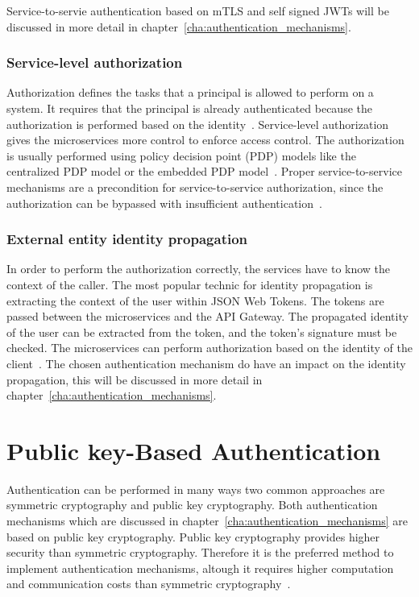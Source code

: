 Service-to-servie authentication based on mTLS and self signed JWTs will be discussed in more detail in chapter~\ref{cha:authentication_mechanisms}.

\subsubsection{Service-level authorization} 
\label{sec:service-level-authorization}
Authorization defines the tasks that a principal is allowed to perform on a system.
It requires that the principal is already authenticated because the authorization is performed based on the identity~\cite{siriwardena2014advanced}. 
Service-level authorization gives the microservices more control to enforce access control.
The authorization is usually performed using policy decision point (PDP) models like the centralized PDP model or the embedded PDP model~\cite{dias2020microservices, barabanov2020authentication}.
Proper service-to-service mechanisms are a precondition for service-to-service authorization, since the authorization can be bypassed with insufficient authentication~\cite{siriwardena2014advanced}.

\subsubsection{External entity identity propagation} 
\label{sec:external-entity-identity-propagation}
In order to perform the authorization correctly, the services have to know the context of the caller.
The most popular technic for identity propagation is extracting the context of the user within JSON Web Tokens.
The tokens are passed between the microservices and the API Gateway.
The propagated identity of the user can be extracted from the token, and the token's signature must be checked.
The microservices can perform authorization based on the identity of the client~\cite{barabanov2020authentication, dias2020microservices}.
The chosen authentication mechanism do have an impact on the identity propagation, this will be discussed in more detail in chapter~\ref{cha:authentication_mechanisms}.

\section{Public key-Based Authentication}
Authentication can be performed in many ways two common approaches are symmetric cryptography and public key cryptography.
Both authentication mechanisms which are discussed in chapter~\ref{cha:authentication_mechanisms} are based on public key cryptography.
Public key cryptography provides higher security than symmetric cryptography.
Therefore it is the preferred method to implement authentication mechanisms, altough it requires higher computation and communication costs than symmetric cryptography~\cite{pubkeycrypto}.

